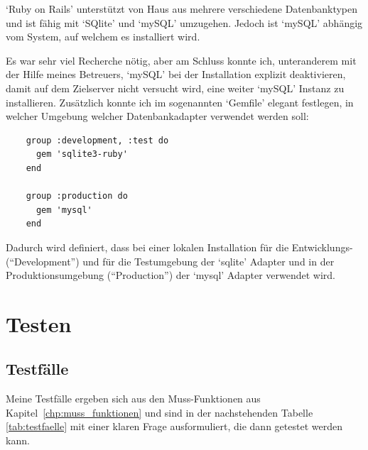 `Ruby on Rails' unterstützt von Haus aus mehrere verschiedene Datenbanktypen und
ist fähig mit `SQlite' und `mySQL' umzugehen. Jedoch ist `mySQL' abhängig vom
System, auf welchem es installiert wird.

Es war sehr viel Recherche nötig, aber am Schluss konnte ich, unteranderem mit
der Hilfe meines Betreuers, `mySQL' bei der Installation explizit deaktivieren,
damit auf dem Zielserver nicht versucht wird, eine weiter `mySQL' Instanz zu
installieren. Zusätzlich konnte ich im sogenannten `Gemfile' elegant festlegen,
in welcher Umgebung welcher Datenbankadapter verwendet werden soll:

\begin{verbatim}
    group :development, :test do
      gem 'sqlite3-ruby'
    end
    
    group :production do
      gem 'mysql'
    end
\end{verbatim}

Dadurch wird definiert, dass bei einer lokalen Installation für die Entwicklungs-
(``Development'') und für die Testumgebung der `sqlite' Adapter und in der 
Produktionsumgebung (``Production'') der `mysql' Adapter verwendet wird.

\section{Testen}
\subsection{Testfälle}
Meine Testfälle ergeben sich aus den Muss-Funktionen aus Kapitel~\ref{chp:muss_funktionen}
und sind in der nachstehenden Tabelle \ref{tab:testfaelle} mit einer klaren Frage
ausformuliert, die dann getestet werden kann.

